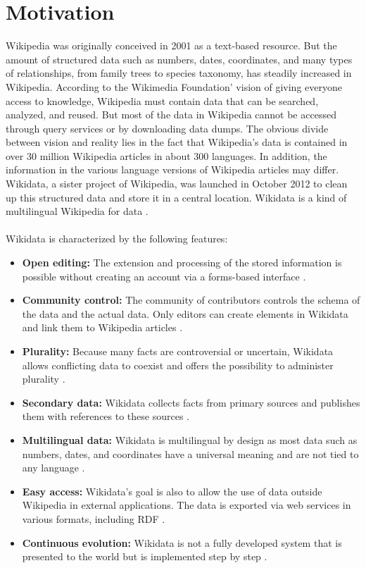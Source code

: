 ﻿\documentclass[11pt,titlepage,oneside,openany]{book}
\begin{document}
\section{Motivation}
Wikipedia was originally conceived in 2001 as a text-based resource. But the amount of structured data such as numbers, dates, coordinates, and many types of relationships, from family trees to species taxonomy, has steadily increased in Wikipedia. According to the Wikimedia Foundation’ vision of giving everyone access to knowledge, Wikipedia must contain data that can be searched, analyzed, and reused. But most of the data in Wikipedia cannot be accessed through query services or by downloading data dumps. The obvious divide between vision and reality lies in the fact that Wikipedia’s data is contained in over 30 million Wikipedia articles in about 300 languages. In addition, the information in the various language versions of Wikipedia articles may differ. Wikidata, a sister project of Wikipedia, was launched in October 2012 to clean up this structured data and store it in a central location. Wikidata is a kind of multilingual Wikipedia for data \cite{AFCK01}.
\\
\\
Wikidata is characterized by the following features:
\begin{itemize}
	\item \textbf{Open editing:} The extension and processing of the stored information is possible without creating an account via a forms-based interface \cite{AFCK01}.
	\item \textbf{Community control:} The community of contributors controls the schema of the data and the actual data. Only editors can create elements in Wikidata and link them to Wikipedia articles \cite{AFCK01}.
	\item \textbf{Plurality:} Because many facts are controversial or uncertain, Wikidata allows conflicting data to coexist and offers the possibility to administer plurality \cite{AFCK01}.
	\item \textbf{Secondary data:} Wikidata collects facts from primary sources and publishes them with references to these sources \cite{AFCK01}.
	\item \textbf{Multilingual data:} Wikidata is multilingual by design as most data such as numbers, dates, and coordinates have a universal meaning and are not tied to any language \cite{AFCK01}.
	\item \textbf{Easy access:} Wikidata's goal is also to allow the use of data outside Wikipedia in external applications. The data is exported via web services in various formats, including RDF \cite{AFCK01}.
	\item \textbf{Continuous evolution:} Wikidata is not a fully developed system that is presented to the world but is implemented step by step \cite{AFCK01}.
\end{itemize}
\end{document}
